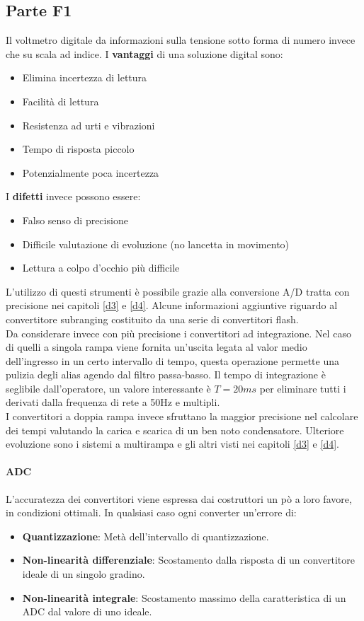 \documentclass[12pt]{article}
\begin{document}
\subsection{Parte F1}\label{f1} %
Il voltmetro digitale da informazioni sulla tensione sotto forma di numero invece che su scala ad indice. I \textbf{vantaggi} di una soluzione digital sono:
\begin{itemize}
  \item Elimina incertezza di lettura
  \item Facilità di lettura
  \item Resistenza ad urti e vibrazioni
  \item Tempo di risposta piccolo
  \item Potenzialmente poca incertezza
\end{itemize}
I \textbf{difetti} invece possono essere:
\begin{itemize}
  \item Falso senso di precisione
  \item Difficile valutazione di evoluzione (no lancetta in movimento)
  \item Lettura a colpo d'occhio più difficile
\end{itemize}

L'utilizzo di questi strumenti è possibile grazie alla conversione A/D tratta con precisione nei capitoli \ref{d3} e \ref{d4}. Alcune informazioni aggiuntive riguardo al convertitore subranging costituito da una serie di convertitori flash.\\
Da considerare invece con più precisione i convertitori ad integrazione. Nel caso di quelli a singola rampa viene fornita un'uscita legata al valor medio dell'ingresso in un certo intervallo di tempo, questa operazione permette una pulizia degli alias agendo dal filtro passa-basso. Il tempo di integrazione è seglibile dall'operatore, un valore interessante è $T=20 ms$ per eliminare tutti i derivati dalla frequenza di rete a 50Hz e multipli.\\
I convertitori a doppia rampa invece sfruttano la maggior precisione nel calcolare dei tempi valutando la carica e scarica di un ben noto condensatore. Ulteriore evoluzione sono i sistemi a multirampa e gli altri visti nei capitoli \ref{d3} e \ref{d4}.

\paragraph{ADC} L'accuratezza dei convertitori viene espressa dai costruttori un pò a loro favore, in condizioni ottimali. In qualsiasi caso ogni converter un'errore di:
\begin{itemize}
  \item \textbf{Quantizzazione}: Metà dell'intervallo di quantizzazione.
  \item \textbf{Non-linearità differenziale}: Scostamento dalla risposta di un convertitore ideale di un singolo gradino.
  \item \textbf{Non-linearità integrale}: Scostamento massimo della caratteristica di un ADC dal valore di uno ideale.
\end{itemize}
\end{document}
